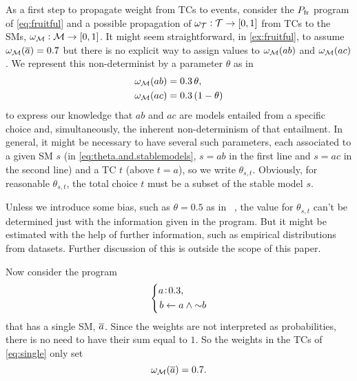 \documentclass[x11names]{tlp}
\renewcommand{\cite}{\citep}
\begin{document}
As a first step to propagate weight from \aclp{TC} to events, consider the $P_{\mathrm{fr}}$ program of \cref{eq:fruitful} and a possible propagation of $\wgtT:\TCHOICEset \to \intcc{0,1}$ from \aclp{TC} to the \aclp{SM}, $\wgtM:\MODELset \to \intcc{0,1}$.
%
%
It might seem straightforward, in \cref{ex:fruitful}, to assume $\wgtM\at{\co{a}}=0.7$ but there is no explicit way to assign values to $\wgtM\at{ab}$ and $\wgtM\at{ac}$.
We represent this non-determinist by a parameter $\theta$ as in
\begin{equation}
	\begin{aligned}
		\wgtM\at{ab} & = 0.3\, \theta,
		\\
		\wgtM\at{ac} & = 0.3\, (1 - \theta)
	\end{aligned}\label{eq:theta.and.stablemodels}
\end{equation}
to express our knowledge that $ab$ and $ac$ are models entailed from a specific choice and, simultaneously, the inherent non-determinism of that entailment.
In general, it might be necessary to have several such parameters, each associated to a given \acl{SM} $s$ (in \cref{eq:theta.and.stablemodels}, $s = ab$ in the first line and $s = ac$ in the second line) and a \acl{TC} $t$ (above $t=a$), so we write $\theta_{s,t}$.
Obviously, for reasonable $\theta_{s,t}$, the total choice $t$ must be a subset of the stable model $s$.

Unless we introduce some bias, such as $\theta = 0.5$ as in \lpmln\ \cite{lee2016weighted}, the value for $\theta_{s,t}$ can't be determined just with the information given in the program. But it might be estimated with the help of further information, such as empirical distributions from datasets.
Further discussion of this is outside the scope of this paper.
%

Now consider the program
\begin{equation}\label{eq:single}
	\left\{\begin{split}
		\weightfact{a & }{0.3},   %
		\\
		b & \clause a \wedge \naf b
	\end{split}
	\right.
\end{equation}
that has a single \ac{SM}, $\overline{a}$. Since the weights are not interpreted as probabilities, there is no need to have their sum equal to $1$. So the weights in the \acp{TC} of \cref{eq:single} only set
$$
\wgtM\at{\co{a}} = 0.7.
$$
\end{document}
